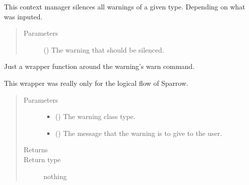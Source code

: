 \documentclass[letterpaper,10pt,english]{sphinxmanual}
\begin{document}
\begin{fulllineitems}
\label{\detokenize{python_docstrings/IfA_Smeargle.meta.errors:IfA_Smeargle.meta.errors.smeargle_silence_specific_warnings}}
This context manager silences all warnings of a given type. Depending
on what was inputed.
\begin{quote}\begin{description}
\item[{Parameters}] \leavevmode
{} () \textendash{} The warning that should be silenced.

\end{description}\end{quote}

\end{fulllineitems}


\begin{fulllineitems}
\label{\detokenize{python_docstrings/IfA_Smeargle.meta.errors:IfA_Smeargle.meta.errors.smeargle_warning}}
Just a wrapper function around the warning’s warn command.

This wrapper was really only for the logical flow of Sparrow.
\begin{quote}\begin{description}
\item[{Parameters}] \leavevmode\begin{itemize}
\item {} 
 () \textendash{} The warning class type.

\item {} 
 () \textendash{} The message that the warning is to give to the user.

\end{itemize}

\item[{Returns}] \leavevmode


\item[{Return type}] \leavevmode
nothing

\end{description}\end{quote}

\end{fulllineitems}
\end{document}
